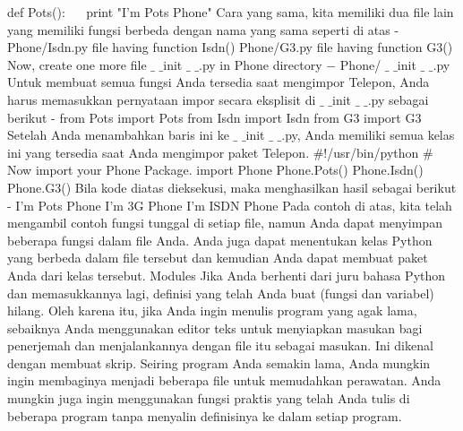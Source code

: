  \hspace*{0.5in} def Pots(): 
 \hspace*{0.5in} ~~ print "I'm Pots Phone" 
Cara yang sama, kita memiliki dua file lain yang memiliki fungsi berbeda dengan nama yang sama seperti di atas - 
Phone/Isdn.py $  $file having function Isdn() 
Phone/G3.py $  $file having function G3()
Now, create one more file  $  \_  $ $  \_  $init $  \_  $ $  \_  $.py in $  $Phone $  $directory  $ - $
Phone/ $  \_  $ $  \_  $init $  \_  $ $  \_  $.py 
Untuk membuat semua fungsi Anda tersedia saat mengimpor Telepon, Anda harus memasukkan pernyataan impor secara eksplisit di  $  \_  $ $  \_  $init $  \_  $ $  \_  $.py sebagai berikut - 
 \hspace*{0.5in} from Pots import Pots
 \hspace*{0.5in} from Isdn import Isdn
 \hspace*{0.5in} from G3 import G3 
Setelah Anda menambahkan baris ini ke  $  \_  $ $  \_  $init $  \_  $ $  \_  $.py, Anda memiliki semua kelas ini yang tersedia saat Anda mengimpor paket Telepon. 
 \hspace*{0.5in}  $  \#  $!/usr/bin/python
 \hspace*{0.5in}  $  \#  $ Now import your Phone Package.
 \hspace*{0.5in} import Phone 
 \hspace*{0.5in} Phone.Pots() 
 \hspace*{0.5in} Phone.Isdn() 
 \hspace*{0.5in} Phone.G3()
Bila kode diatas dieksekusi, maka menghasilkan hasil sebagai berikut - 
 \hspace*{0.5in} I'm Pots Phone
 \hspace*{0.5in} I'm 3G Phone 
 \hspace*{0.5in} I'm ISDN Phone 
Pada contoh di atas, kita telah mengambil contoh fungsi tunggal di setiap file, namun Anda dapat menyimpan beberapa fungsi dalam file Anda. Anda juga dapat menentukan kelas Python yang berbeda dalam file tersebut dan kemudian Anda dapat membuat paket Anda dari kelas tersebut. 
Modules
Jika Anda berhenti dari juru bahasa Python dan memasukkannya lagi, definisi yang telah Anda buat (fungsi dan variabel) hilang. Oleh karena itu, jika Anda ingin menulis program yang agak lama, sebaiknya Anda menggunakan editor teks untuk menyiapkan masukan bagi penerjemah dan menjalankannya dengan file itu sebagai masukan. Ini dikenal dengan membuat skrip. Seiring program Anda semakin lama, Anda mungkin ingin membaginya menjadi beberapa file untuk memudahkan perawatan. Anda mungkin juga ingin menggunakan fungsi praktis yang telah Anda tulis di beberapa program tanpa menyalin definisinya ke dalam setiap program.
